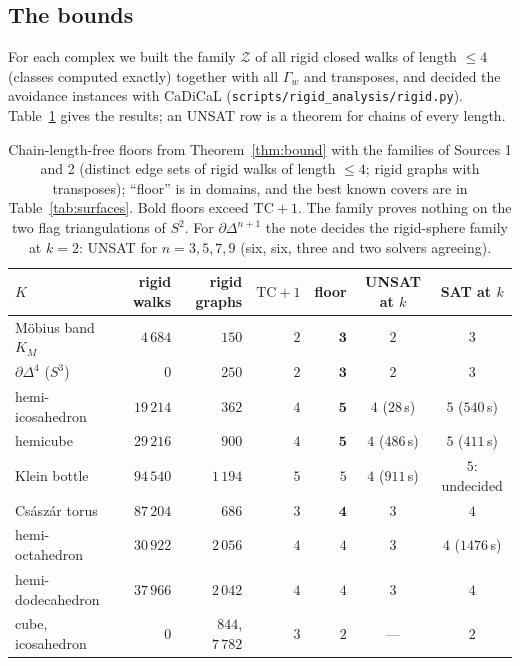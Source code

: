 \documentclass[12pt]{article}
\newcommand{\TC}{\mathrm{TC}}
\begin{document}
\subsection{The bounds}

For each complex we built the family $\mathcal Z$ of all rigid closed walks
of length $\le4$ (classes computed exactly) together with all $\Gamma_w$ and
transposes, and decided the avoidance instances with CaDiCaL
(\texttt{scripts/rigid\_analysis/rigid.py}).  Table~\ref{tab:floors} gives
the results; an UNSAT row is a theorem for chains of every length.

\begin{table}[H]
\centering\footnotesize
\setlength{\tabcolsep}{4pt}
\setlength{\tabcolsep}{3pt}
\begin{tabular}{@{}lrrrrcc@{}}
\toprule
$K$ & rigid walks & rigid graphs & $\TC{+}1$ & floor & UNSAT at $k$ & SAT at $k$ \\
\midrule
M\"obius band $K_M$ & $4\,684$ & $150$ & $2$ & $\mathbf 3$ & $2$ & $3$ \\
$\partial\Delta^4$ ($S^3$) & $0$ & $250$ & $2$ & $\mathbf 3$ & $2$ & $3$ \\
hemi-icosahedron & $19\,214$ & $362$ & $4$ & $\mathbf 5$ & $4$ ($28$\,s) & $5$ ($540$\,s) \\
hemicube & $29\,216$ & $900$ & $4$ & $\mathbf 5$ & $4$ ($486$\,s) & $5$ ($411$\,s) \\
Klein bottle & $94\,540$ & $1\,194$ & $5$ & $5$ & $4$ ($911$\,s) & $5$: undecided \\
Cs\'asz\'ar torus & $87\,204$ & $686$ & $3$ & $\mathbf 4$ & $3$ & $4$ \\
hemi-octahedron & $30\,922$ & $2\,056$ & $4$ & $4$ & $3$ & $4$ ($1476$\,s) \\
hemi-dodecahedron & $37\,966$ & $2\,042$ & $4$ & $4$ & $3$ & $4$ \\
cube, icosahedron & $0$ & $844$, $7\,782$ & $3$ & $2$ & --- & $2$ \\
\bottomrule
\end{tabular}
\caption{Chain-length-free floors from Theorem~\ref{thm:bound} with the
families of Sources 1 and 2 (distinct edge sets of rigid walks of length
$\le4$; rigid graphs with transposes); ``floor'' is in domains, and the best
known covers are in Table~\ref{tab:surfaces}.  Bold floors exceed $\TC+1$.  The
family proves nothing on the two flag triangulations of $S^2$.  For
$\partial\Delta^{n+1}$ the note \cite{PM26b} decides the rigid-sphere family
at $k=2$: UNSAT for $n=3,5,7,9$ (six, six, three and two solvers agreeing).}
\label{tab:floors}
\end{table}
\end{document}
